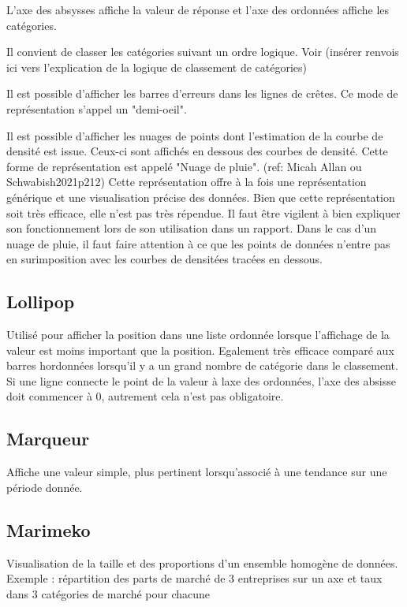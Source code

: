 \documentclass[a4paper,12pt]{article}
\begin{document}
\begin{multicols}{2}
L'axe des absysses affiche la valeur de réponse et l'axe des ordonnées affiche les catégories. \autocite{wilkeVisualizingManyDistributions2019}

Il convient de classer les catégories suivant un ordre logique. \autocite{jonathanschwabishDistribution2021} Voir (insérer renvois ici vers l'explication de la logique de classement de catégories)

Il est possible d'afficher les barres d'erreurs dans les lignes de crêtes. Ce mode de représentation s'appel un "demi-oeil". \autocite{wilkeVisualizingUncertainty2019}

Il est possible d'afficher les nuages de points dont l'estimation de la courbe de densité est issue. Ceux-ci sont affichés en dessous des courbes de densité. Cette forme de représentation est appelé "Nuage de pluie". (ref: Micah Allan ou Schwabish2021p212) Cette représentation offre à la fois une représentation générique et une visualisation précise des données. \autocite{jonathanschwabishDistribution2021} Bien que cette représentation soit très efficace, elle n'est pas très répendue. \autocite{jonathanschwabishDistribution2021} Il faut être vigilent à bien expliquer son fonctionnement lors de son utilisation dans un rapport. Dans le cas d'un nuage de pluie, il faut faire attention à ce que les points de données n'entre pas en surimposition avec les courbes de densitées tracées en dessous.
\subsection*{Lollipop}
\label{sec:org079d4ae}
Utilisé pour afficher la position dans une liste ordonnée lorsque l'affichage de la valeur est moins important que la position. \autocite{alansmithLexiqueVisuel} Egalement très efficace comparé aux barres hordonnées lorsqu'il y a un grand nombre de catégorie dans le classement. \autocite{mikeyiHowChooseRight2020}  Si une ligne connecte le point de la valeur à laxe des ordonnées, l'axe des absisse doit commencer à 0, autrement cela n'est pas obligatoire.
\subsection*{Marqueur}
\label{sec:org440e9cd}
Affiche une valeur simple, plus pertinent lorsqu'associé à une tendance sur une période donnée. \autocite{mikeyiHowChooseRight2020}
\subsection*{Marimeko}
\label{sec:org0a5f577}
Visualisation de la taille et des proportions d'un ensemble homogène de données. \autocite{alansmithLexiqueVisuel}
Exemple : répartition des parts de marché de 3 entreprises sur un axe et taux dans 3 catégories de marché pour chacune


\end{multicols}
\end{document}
